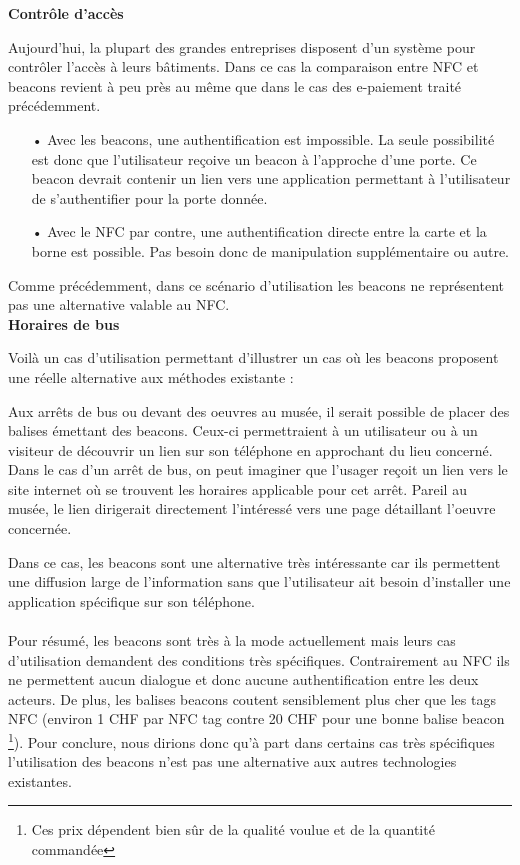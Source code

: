 \documentclass[12pt]{article}
\begin{document}
\textbf{Contrôle d'accès}
\medskip

Aujourd'hui, la plupart des grandes entreprises disposent d'un système pour contrôler l'accès à leurs bâtiments. Dans ce cas la comparaison entre NFC et beacons revient à peu près au même que dans le cas des e-paiement traité précédemment.

\begin{itemize}
\item[•] Avec les beacons, une authentification est impossible. La seule possibilité est donc que l'utilisateur reçoive un beacon à l'approche d'une porte. Ce beacon devrait contenir un lien vers une application permettant à l'utilisateur de s'authentifier pour la porte donnée.

\item[•] Avec le NFC par contre, une authentification directe entre la carte et la borne est possible. Pas besoin donc de manipulation supplémentaire ou autre.
\end{itemize}

Comme précédemment, dans ce scénario d'utilisation les beacons ne représentent pas une alternative valable au NFC. \\

\textbf{Horaires de bus}
\medskip

Voilà un cas d'utilisation permettant d'illustrer un cas où les beacons proposent une réelle alternative aux méthodes existante : 

Aux arrêts de bus ou devant des oeuvres au musée, il serait possible de placer des balises émettant des beacons. Ceux-ci permettraient à un utilisateur ou à un visiteur de découvrir un lien sur son téléphone en approchant du lieu concerné. Dans le cas d'un arrêt de bus, on peut imaginer que l'usager reçoit un lien vers le site internet où se trouvent les horaires applicable pour cet arrêt. Pareil au musée, le lien dirigerait directement l'intéressé vers une page détaillant l'oeuvre concernée.

Dans ce cas, les beacons sont une alternative très intéressante car ils permettent une diffusion large de l'information sans que l'utilisateur ait besoin d'installer une application spécifique sur son téléphone. \\\\

Pour résumé, les beacons sont très à la mode actuellement mais leurs cas d'utilisation demandent des conditions très spécifiques. Contrairement au NFC ils ne permettent aucun dialogue et donc aucune authentification entre les deux acteurs. De plus, les balises beacons coutent sensiblement plus cher que les tags NFC (environ 1 CHF par NFC tag contre 20 CHF pour une bonne balise beacon \footnote{Ces prix dépendent bien sûr de la qualité voulue et de la quantité commandée}). 
Pour conclure, nous dirions donc qu'à part dans certains cas très spécifiques l'utilisation des beacons n'est pas une alternative aux autres technologies existantes.
\end{document}
